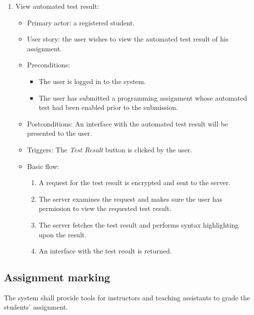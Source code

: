 \begin{enumerate}
\item View automated test result:
\begin{itemize}
    \item Primary actor: a registered student.
    \item User story: the user wishes to view the automated test result of his
        assignment.
    \item Preconditions:
        \begin{itemize}
            \item The user is logged in to the system.
            \item The user has submitted a programming assignment whose
                automated test had been enabled prior to the submission.
        \end{itemize}
    \item Postconditions:
        An interface with the automated test result will be presented to the
        user.
    \item Triggers: 
        The \emph{Test Result} button is clicked by the user.
    \item Basic flow:
        \begin{enumerate}
            \item A request for the test result is encrypted and sent to the
                server.
            \item The server examines the request and makes sure the user has
                permission to view the requested test result.
            \item The server fetches the test result and performs syntax
                highlighting upon the result.
            \item An interface with the test result is returned.
        \end{enumerate}
\end{itemize}
\end{enumerate}

\subsection{Assignment marking}
The system shall provide tools for instructors and teaching assistants to grade
the students' assignment.

